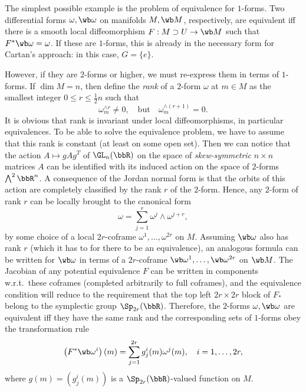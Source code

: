 \begin{example}
    The simplest possible example is the problem of equivalence for $1$-forms. Two differential forms $\omega,\wb\omega$ on manifolds $M,\wb M$, respectively, are equivalent iff there is a smooth local diffeomorphism $F:M\supset U\to \wb M$ such that $F^\ast \wb\omega=\omega$. If these are $1$-forms, this is already in the necessary form for Cartan's approach: in this case, $G=\{e\}$. 
    
    However, if they are $2$-forms or higher, we must re-express them in terms of $1$-forms. If $\dim M=n$, then define the \emph{rank} of a $2$-form $\omega$ at $m\in M$ as the smallest integer $0\leq r\leq \frac12 n$ such that 
    \[\omega^{\wedge r}_m\neq 0,\quad \text{but}\quad \omega^{\wedge(r+1)}_m=0.\]
    It is obvious that rank is invariant under local diffeomorphisms, in particular equivalences. To be able to solve the equivalence problem, we have to assume that this rank is constant (at least on some open set). Then we can notice that the action $A\mapsto gAg^T$ of $\GL_n(\bbR)$ on the space of \emph{skew-symmetric} $n\times n$ matrices $A$ can be identified with its induced action on the space of $2$-forms $\bigwedge^2\bbR^n$. A consequence of the Jordan normal form is that the orbits of this action are completely classified by the rank $r$ of the $2$-form. Hence, any $2$-form of rank $r$ can be locally brought to the canonical form 
    \[\omega=\sum_{j=1}^r \omega^j\wedge\omega^{j+r},\]
    by some choice of a local $2r$-coframe $\omega^1,\ldots,\omega^{2r}$ on $M$. Assuming $\wb \omega$ also has rank $r$ (which it has to for there to be an equivalence), an analogous formula can be written for $\wb\omega$ in terms of a $2r$-coframe $\wb\omega^1,\ldots,\wb\omega^{2r}$ on $\wb M$. The Jacobian of any potential equivalence $F$ can be written in components w.r.t.\ these coframes (completed arbitrarily to full coframes), and the equivalence condition will reduce to the requirement that the top left $2r\times 2r$ block of $F_\ast$ belong to the symplectic group $\Sp_{2r}(\bbR)$. Therefore, the $2$-forms $\omega,\wb\omega$ are equivalent iff they have the same rank and the corresponding sets of $1$-forms obey the transformation rule 
    \[\left(F^\ast\wb\omega^i\right)(m)=\sum_{j=1}^{2r}g^i_j(m)\omega^j(m),\quad i=1,\ldots,2r,\]
    where $g(m)=\left(g^i_j(m)\right)$ is a $\Sp_{2r}(\bbR)$-valued function on $M$.
\end{example}


\PRLsep

